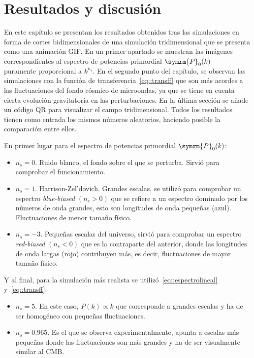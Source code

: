 \chapter{Resultados y discusión}
En este capítulo se presentan los resultados obtenidos tras las simulaciones en forma de cortes bidimensionales de una simulación tridimensional que se presenta como una animación GIF. En un primer apartado se muestran las imágenes correspondientes al espectro de potencias primordial \(\symrm{P}_0(k)\) ---puramente proporcional a \(k^{n_s}\). En el segundo punto del capítulo, se observan las simulaciones con la función de transferencia~\eqref{eq::transff} que son más acordes a las fluctuaciones del fondo cósmico de microondas, ya que se tiene en cuenta cierta evolución gravitatoria en las perturbaciones. En la última sección se añade un código QR para visualizar el campo tridimensional. Todos los resultados tienen como entrada los mismos números aleatorios, haciendo posible la comparación entre ellos.

En primer lugar para el espectro de potencias primordial \(\symrm{P}_0(k)\):
\begin{itemize}
    \item \(n_s=0\). Ruido blanco, el fondo sobre el que se perturba. Sirvió para comprobar el funcionamiento.
    \item \(n_s=1\). Harrison-Zel'dovich. Grandes escalas, se utilizó para comprobar un espectro \textit{blue-biased} \((n_s>0)\) que se refiere a un espectro dominado por los números de onda grandes, esto son longitudes de onda pequeñas (azul). Fluctuaciones de menor tamaño físico.
    \item \(n_s=-3\). Pequeñas escalas del universo, sirvió para comprobar un espectro \textit{red-biased} \((n_s<0)\) que es la contraparte del anterior, donde las longitudes de onda largas (rojo) contribuyen más, es decir, fluctuaciones de mayor tamaño físico.
\end{itemize}
Y al final, para la simulación más realista se utilizó~\eqref{eq::espectrolineal} y~\eqref{eq::transff}:
\begin{itemize}
    \item \(n_s=5\). En este caso, \(P(k)\propto k\) que corresponde a grandes escalas y ha de ser homogéneo con pequeñas fluctuaciones.
    \item \(n_s=0.965\). Es el que se observa experimentalmente, apunta a escalas más pequeñas donde las fluctuaciones son más grandes y ha de ser visualmente similar al CMB.
\end{itemize}

